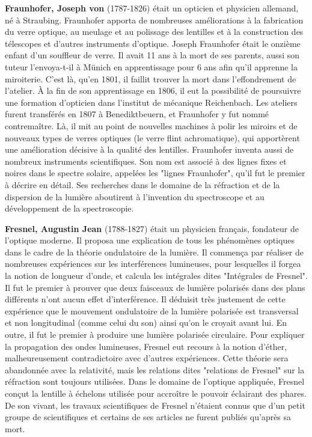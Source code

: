\textbf{Fraunhofer, Joseph von} (1787-1826) était un opticien et physicien allemand, né à Straubing. Fraunhofer apporta de nombreuses améliorations à la fabrication du verre optique, au meulage et au polissage des lentilles et à la construction des télescopes et d'autres instruments d'optique. Joseph Fraunhofer était le onzième enfant d'un souffleur de verre. Il avait 11 ans à la mort de ses parents, aussi son tuteur l'envoya-t-il à Münich en apprentissage pour 6 ans afin qu'il apprenne la miroiterie. C'est là, qu'en 1801, il faillit trouver la mort dans l'effondrement de l'atelier. À la fin de son apprentissage en 1806, il eut la possibilité de poursuivre une formation d'opticien dans l'institut de mécanique Reichenbach. Les ateliers furent transférés en 1807 à Benediktbeuern, et Fraunhofer y fut nommé contremaître. Là, il mit au point de nouvelles machines à polir les miroirs et de nouveaux types de verres optiques (le verre flint achromatique), qui apportèrent une amélioration décisive à la qualité des lentilles. Fraunhofer inventa aussi de nombreux instruments scientifiques. Son nom est associé à des lignes fixes et noires dans le spectre solaire, appelées les "lignes Fraunhofer", qu'il fut le premier à décrire en détail. Ses recherches dans le domaine de la réfraction et de la dispersion de la lumière aboutirent à l'invention du spectroscope et au développement de la spectroscopie.

\textbf{Fresnel, Augustin Jean} (1788-1827) était un physicien français, fondateur de l'optique moderne. Il proposa une explication de tous les phénomènes optiques dans le cadre de la théorie ondulatoire de la lumière. Il commença par réaliser de nombreuses expériences sur les interférences lumineuses, pour lesquelles il forgea la notion de longueur d'onde, et calcula les intégrales dites "Intégrales de Fresnel". Il fut le premier à prouver que deux faisceaux de lumière polarisés dans des plans différents n'ont aucun effet d'interférence. Il déduisit très justement de cette expérience que le mouvement ondulatoire de la lumière polarisée est transversal et non longitudinal (comme celui du son) ainsi qu'on le croyait avant lui. En outre, il fut le premier à produire une lumière polarisée circulaire. Pour expliquer la propagation des ondes lumineuses, Fresnel eut recours à la notion d'éther, malheureusement contradictoire avec d'autres expériences. Cette théorie sera abandonnée avec la relativité, mais les relations dites "relations de Fresnel" sur la réfraction sont toujours utilisées. Dans le domaine de l'optique appliquée, Fresnel conçut la lentille à échelons utilisée pour accroître le pouvoir éclairant des phares. De son vivant, les travaux scientifiques de Fresnel n'étaient connus que d'un petit groupe de scientifiques et certains de ses articles ne furent publiés qu'après sa mort.


